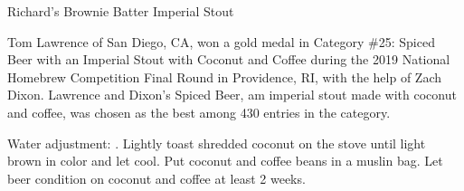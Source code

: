 \begin{recipe}{Richard's Brownie Batter Imperial Stout}

\begin{aboutblock}
Tom Lawrence of San Diego, CA, won a gold medal in Category \#25: Spiced Beer with
an Imperial Stout with Coconut and Coffee during the 2019 National Homebrew Competition
Final Round in Providence, RI, with the help of Zach Dixon. Lawrence and Dixon's Spiced
Beer, am imperial stout made with coconut and coffee, was chosen as the best among 430
entries in the category. \sourceaha
\end{aboutblock}


\begin{methodandtiming}
 
\begin{mashsteps}
\end{mashsteps}

\begin{fermentationsteps}
\end{fermentationsteps}

\begin{directions}
Water adjustment: . Lightly toast shredded
coconut on the stove until light brown in color and let cool. Put coconut and
coffee beans in a muslin bag. Let beer condition on coconut and coffee at least
2 weeks.
\end{directions}

\end{methodandtiming}

\recipebreak

\begin{ingredientsblock}

\begin{malts}
\end{malts}


\end{ingredientsblock}
\end{recipe}

